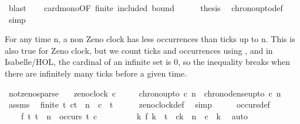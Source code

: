 \begin{isabellebody}
\ blast\isanewline
\ \ \isamarkupfalse%
\ card{\isacharunderscore}mono{\isacharbrackleft}OF\ finite\ included{\isacharbrackright}\ bound\isanewline
\ \ \ \ \isamarkupfalse%
\ {\isacharquery}thesis\ \isamarkupfalse%
\ chrono{\isacharunderscore}up{\isacharunderscore}to{\isacharunderscore}def\ \isamarkupfalse%
\ simp\isanewline
{}\isamarkupfalse%
%
\endisatagproof
{\isafoldproof}%
%
\isadelimproof
%
\endisadelimproof
%
\begin{isamarkuptext}%
For any time n, a non Zeno clock has less occurrences than ticks up to n.
This is also true for Zeno clock, but we count ticks and occurrences using ,
and in Isabelle/HOL, the cardinal of an infinite set is 0, so the inequality breaks when
there are infinitely many ticks before a given time.%
\end{isamarkuptext}\isamarkuptrue%
\isamarkupfalse%
\ not{\isacharunderscore}zeno{\isacharunderscore}sparse{\isacharcolon}\isanewline
\ \ \ {\isacartoucheopen}{\isasymnot}zeno{\isacharunderscore}clock\ c{\isacartoucheclose}\isanewline
\ \ \ \ \ {\isacartoucheopen}chrono{\isacharunderscore}up{\isacharunderscore}to\ c\ n\ {\isasymle}\ chrono{\isacharunderscore}dense{\isacharunderscore}up{\isacharunderscore}to\ c\ n{\isacartoucheclose}\isanewline
%
\isadelimproof
%
\endisadelimproof
%
\isatagproof
{}\isamarkupfalse%
\ {\isacharminus}\isanewline
\ \ \isamarkupfalse%
\ assms\ \isamarkupfalse%
\ {\isacartoucheopen}finite\ {\isacharbraceleft}t{\isachardot}\ c\isactrlbsub t\isactrlesub \ {\isasymle}\ n\ {\isasymand}\ c\ {\isasymnabla}\ t{\isacharbraceright}{\isacartoucheclose}\isanewline
\ \ \ \ \isamarkupfalse%
\ zeno{\isacharunderscore}clock{\isacharunderscore}def\ \isamarkupfalse%
\ simp\isanewline
\ \ \isamarkupfalse%
\ \isamarkupfalse%
\ occurs{\isacharunderscore}def\ \isamarkupfalse%
\isanewline
\ \ \ \ {\isacartoucheopen}{\isasymexists}f{\isachardot}\ {\isasymforall}t{\isachardot}\ t\ {\isasymle}\ n\ {\isasymand}\ occurs\ t\ c\ {\isasymlongrightarrow}\isanewline
\ \ \ \ \ \ \ \ {\isacharparenleft}{\isasymexists}k{\isachardot}\ f\ k\ {\isacharequal}\ t\ {\isasymand}\ c\isactrlbsub k\isactrlesub \ {\isasymle}\ n\ {\isasymand}\ c\ {\isasymnabla}\ k{\isacharparenright}{\isacartoucheclose}\ \isamarkupfalse%
\ auto\isanewline
\ \ \isamarkupfalse%

\end{isabellebody}
